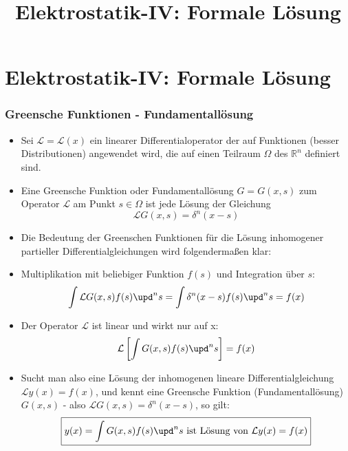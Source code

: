 

\title[TET: Elektrostatik-IV: Formale Lösung]{Elektrostatik-IV: Formale Lösung}


% 
% 

\maketitle

% 
% 
\section{Elektrostatik-IV: Formale Lösung}

\begin{frame}

  \frametitle{Greensche Funktionen - Fundamentallösung}

  \begin{itemize}[<+->]
  \item Sei $\mathcal{L}=\mathcal{L}(x)$ ein \alert{linearer Differentialoperator} der auf Funktionen (besser Distributionen) angewendet wird, die auf einen Teilraum $\Omega$ des $\mathbb{R}^n$ definiert sind.
  \item  Eine \alert{Greensche Funktion} oder \alert{Fundamentallösung} $G=G(x,s)$ zum Operator $\mathcal{L}$ am Punkt $s\in \Omega$ ist \alert{jede Lösung} der Gleichung
    $$
    \mathcal{L}G(x,s) = \delta^n(x-s)
    $$
  \item Die Bedeutung der Greenschen Funktionen für die Lösung inhomogener partieller Differentialgleichungen wird folgendermaßen klar:
  \item Multiplikation mit beliebiger Funktion $f(s)$ und Integration über $s$:
    $$
    \int \mathcal{L}G(x,s)f(s) \upd^n s = \int \delta^n(x-s) f(s) \upd^n s = f(x)
    $$
  \item Der Operator $\mathcal{L}$ ist linear und wirkt nur auf x:
    $$
    \mathcal{L}\left[ \int G(x,s)f(s) \upd^n s  \right] = f(x)
    $$
  \item Sucht man also eine Lösung der inhomogenen lineare Differentialgleichung $\mathcal{L} y(x) = f(x)$, und kennt eine Greensche Funktion (Fundamentallösung) $G(x,s)$ - also $\mathcal{L}G(x,s)=\delta^n(x-s)$, so gilt:
    $$
    \boxed{y(x) = \int G(x,s)f(s)\upd^n s \text{ ist Lösung von } \mathcal{L} y(x) = f(x)}
    $$
  \end{itemize}
  
\end{frame}


